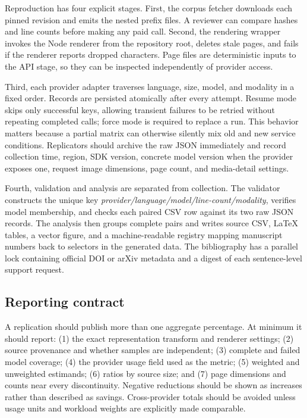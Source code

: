\documentclass[sigconf,nonacm]{acmart}
\begin{document}
Reproduction has four explicit stages. First, the corpus fetcher downloads each
pinned revision and emits the nested prefix files. A reviewer can compare hashes
and line counts before making any paid call. Second, the rendering wrapper
invokes the Node renderer from the repository root, deletes stale pages, and
fails if the renderer reports dropped characters. Page files are deterministic
inputs to the API stage, so they can be inspected independently of provider
access.

Third, each provider adapter traverses language, size, model, and modality in a
fixed order. Records are persisted atomically after every attempt. Resume mode
skips only successful keys, allowing transient failures to be retried without
repeating completed calls; force mode is required to replace a run. This
behavior matters because a partial matrix can otherwise silently mix old and
new service conditions. Replicators should archive the raw JSON immediately and
record collection time, region, SDK version, concrete model version when the
provider exposes one, request image dimensions, page count, and media-detail
settings.

Fourth, validation and analysis are separated from collection. The validator
constructs the unique key
\emph{provider/language/model/line-count/modality}, verifies model membership,
and checks each paired CSV row against its two raw JSON records. The analysis
then groups complete pairs and writes source CSV, LaTeX tables, a vector figure,
and a machine-readable registry mapping manuscript numbers back to selectors in
the generated data. The bibliography has a parallel lock containing official
DOI or arXiv metadata and a digest of each sentence-level support request.

\subsection{Reporting contract}

A replication should publish more than one aggregate percentage. At minimum it
should report: (1) the exact representation transform and renderer settings;
(2) source provenance and whether samples are independent; (3) complete and
failed model coverage; (4) the provider usage field used as the metric;
(5) weighted and unweighted estimands; (6) ratios by source size; and (7) page
dimensions and counts near every discontinuity. Negative reductions should be
shown as increases rather than described as savings. Cross-provider totals
should be avoided unless usage units and workload weights are explicitly made
comparable.
\end{document}
